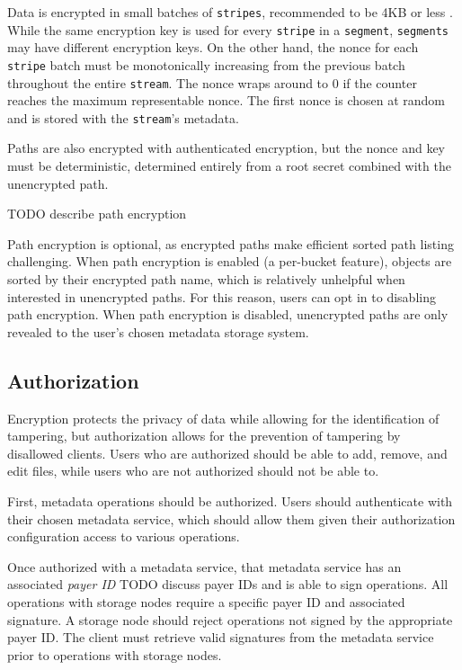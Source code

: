 \documentclass[a4paper,10pt]{article} \usepackage[utf8]{inputenc}
\newcommand{\x}[1]{{\tt #1}} \newcommand{\code}[1]{{\tt #1}}
\newcommand{\todo}[1]{{\color{red} TODO #1 }}
\begin{document}
Data is encrypted in small batches of \x{stripes}, recommended to be 4KB or
less \cite{nacl-packetlen}. While the same encryption key is used for every
\x{stripe} in a \x{segment}, \x{segments} may have
different encryption keys. On the other hand, the nonce for each \x{stripe}
batch must be monotonically increasing from the previous batch throughout the
entire \x{stream}. The nonce wraps around to 0 if the counter reaches the
maximum representable nonce. The first nonce is chosen at random and is stored
with the \x{stream}'s metadata.

Paths are also encrypted with authenticated encryption, but the nonce and key
must be deterministic, determined entirely from a root secret combined with the
unencrypted path.

\todo{describe path encryption}

Path encryption is optional, as encrypted paths make efficient sorted path
listing challenging. When path encryption is enabled (a per-bucket feature),
objects are sorted by their encrypted path name, which is relatively unhelpful
when interested in unencrypted paths. For this reason, users can opt in to
disabling path encryption. When path encryption is disabled, unencrypted paths
are only revealed to the user's chosen metadata storage system.

\subsection{Authorization}

Encryption protects the privacy of data while allowing for the identification
of tampering, but authorization allows for the prevention of tampering by
disallowed clients. Users who are authorized should be able to add, remove,
and edit files, while users who are not authorized should not be able to.

First, metadata operations should be authorized. Users should authenticate with
their chosen metadata service, which should allow them given their authorization
configuration access to various operations.

Once authorized with a metadata service, that metadata service has an associated
{\em payer ID} \todo{discuss payer IDs} and is able to sign operations. All
operations with storage nodes require a specific payer ID and associated
signature. A storage node should reject operations not signed by the appropriate
payer ID. The client must retrieve valid signatures from the metadata service
prior to operations with storage nodes.
\end{document}
